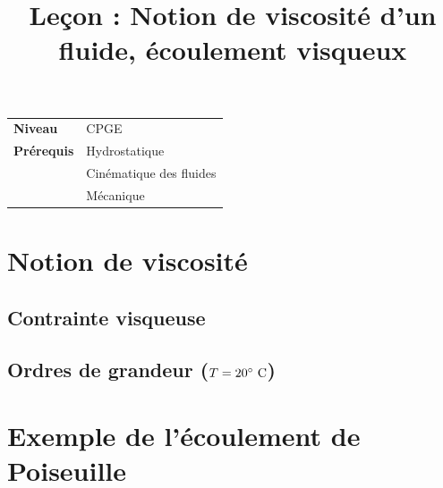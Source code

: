 \documentclass[10pt]{beamer}
\title{Leçon : Notion de viscosité d'un fluide, écoulement visqueux}
\begin{document}
\begin{frame}{}
    \titlepage

    \begin{tabularx}{\textwidth}{l@{:\,\,}X}
        \textbf{Niveau} 	  & CPGE\\
        \textbf{Prérequis} & Hydrostatique\\
        &			Cinématique des fluides\\
        & 			Mécanique
    \end{tabularx}
\end{frame}


\section{Notion de viscosité}
\subsection{Contrainte visqueuse}
\subsection{Ordres de grandeur ($T=20^\circ~\rm C$)}
\begin{frame}
    \begin{table}
        \centering
    \caption{Cours de Marc Rabaud \url{http://www.fast.u-psud.fr/~rabaud/NotesCours_Agreg.pdf}}
\end{table}
\end{frame}

\section{Exemple de l'écoulement de Poiseuille}
\end{document}
